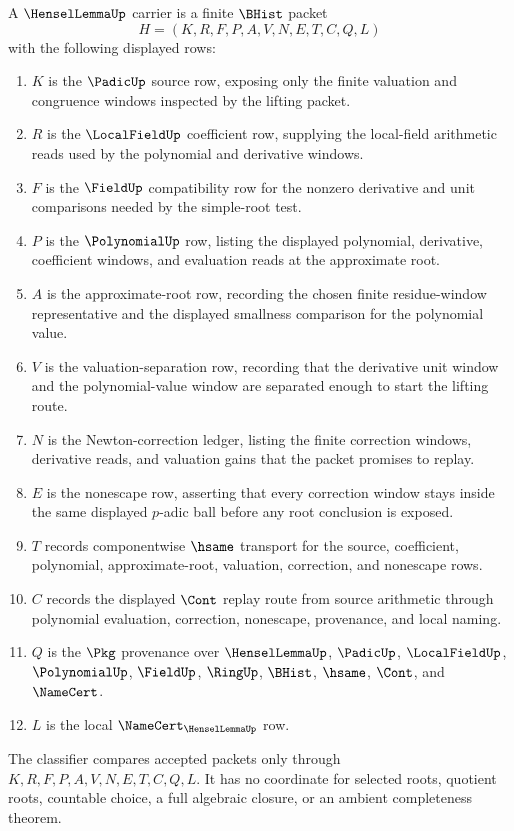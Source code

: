 \begin{definition}
\label{def:hensel-lemma-carrier}
A $\HenselLemmaUp$ carrier is a finite $\BHist$ packet
$$
H=(K,R,F,P,A,V,N,E,T,C,Q,L)
$$
with the following displayed rows:
\begin{enumerate}
\item $K$ is the $\PadicUp$ source row, exposing only the finite valuation and congruence windows inspected by the lifting packet.
\item $R$ is the $\LocalFieldUp$ coefficient row, supplying the local-field arithmetic reads used by the polynomial and derivative windows.
\item $F$ is the $\FieldUp$ compatibility row for the nonzero derivative and unit comparisons needed by the simple-root test.
\item $P$ is the $\PolynomialUp$ row, listing the displayed polynomial, derivative, coefficient windows, and evaluation reads at the approximate root.
\item $A$ is the approximate-root row, recording the chosen finite residue-window representative and the displayed smallness comparison for the polynomial value.
\item $V$ is the valuation-separation row, recording that the derivative unit window and the polynomial-value window are separated enough to start the lifting route.
\item $N$ is the Newton-correction ledger, listing the finite correction windows, derivative reads, and valuation gains that the packet promises to replay.
\item $E$ is the nonescape row, asserting that every correction window stays inside the same displayed $p$-adic ball before any root conclusion is exposed.
\item $T$ records componentwise $\hsame$ transport for the source, coefficient, polynomial, approximate-root, valuation, correction, and nonescape rows.
\item $C$ records the displayed $\Cont$ replay route from source arithmetic through polynomial evaluation, correction, nonescape, provenance, and local naming.
\item $Q$ is the $\Pkg$ provenance over $\HenselLemmaUp$, $\PadicUp$, $\LocalFieldUp$, $\PolynomialUp$, $\FieldUp$, $\RingUp$, $\BHist$, $\hsame$, $\Cont$, and $\NameCert$.
\item $L$ is the local $\NameCert_{\HenselLemmaUp}$ row.
\end{enumerate}
The classifier compares accepted packets only through $K,R,F,P,A,V,N,E,T,C,Q,L$. It has no coordinate for selected roots, quotient roots, countable choice, a full algebraic closure, or an ambient completeness theorem.
\end{definition}

